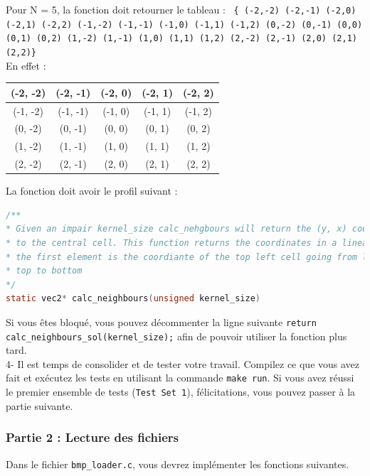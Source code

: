 \documentclass[a4paper]{article}
\begin{document}
	Pour N = 5, la fonction doit retourner le tableau : \texttt{ \{ (-2,-2) (-2,-1) (-2,0) (-2,1) (-2,2) (-1,-2) (-1,-1) (-1,0) (-1,1) (-1,2) (0,-2) (0,-1) (0,0) (0,1) (0,2) (1,-2) (1,-1) (1,0) (1,1) (1,2) (2,-2) (2,-1) (2,0) (2,1) (2,2)\} } \\
	En effet : 
	\begin{center}
		\begin{tabular}{ | c | c | c | c | c | } 
		\hline
		(-2, -2) & (-2, -1) & (-2, 0) & (-2, 1) & (-2, 2) \\
		\hline
		(-1, -2) & (-1, -1) & (-1, 0) & (-1, 1) & (-1, 2) \\
		\hline
		(0, -2) & (0, -1) & (0, 0) & (0, 1) & (0, 2) \\
		\hline
		(1, -2) & (1, -1) & (1, 0) & (1, 1) & (1, 2) \\
		\hline
		(2, -2) & (2, -1) & (2, 0) & (2, 1) & (2, 2) \\
		\hline
		\end{tabular}
	\end{center}
	La fonction doit avoir le profil suivant : 
	\begin{lstlisting}[language=C]
/**
* Given an impair kernel_size calc_nehgbours will return the (y, x) coordinates relative
* to the central cell. This function returns the coordinates in a linear array where
* the first element is the coordiante of the top left cell going from left to right and from
* top to bottom
*/ 
static vec2* calc_neighbours(unsigned kernel_size)
	\end{lstlisting}
	Si vous êtes bloqué, vous pouvez décommenter la ligne suivante \texttt{return calc\_neighbours\_sol(kernel\_size);} afin de pouvoir utiliser la fonction plus tard.\\
	
	4- Il est temps de consolider et de tester votre travail. Compilez ce que vous avez fait et exécutez les tests en utilisant la commande \texttt{make run}. Si vous avez réussi le premier ensemble de tests (\texttt{Test Set 1}), félicitations, vous pouvez passer à la partie suivante.
	\subsubsection*{Partie 2 : Lecture des fichiers}
	Dans le fichier \texttt{bmp\_loader.c}, vous devrez implémenter les fonctions suivantes. \\
	
\end{document}

